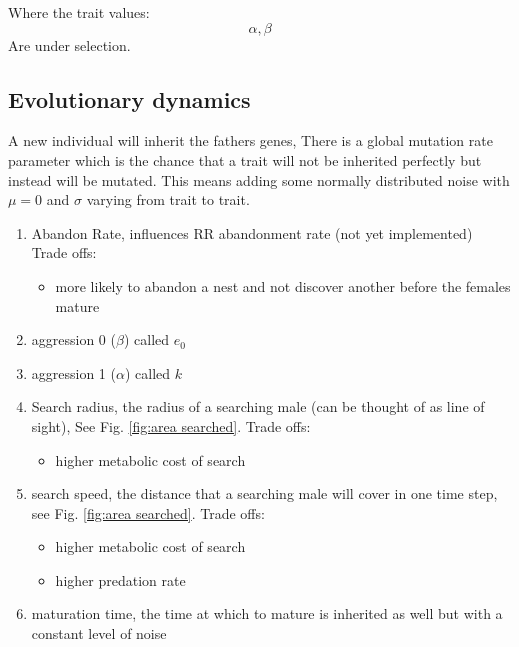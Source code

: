 \documentclass[a4paper,11pt]{article}
\begin{document}
Where the trait values:
$$\alpha , \beta$$
Are under selection.


\clearpage

\subsection{Evolutionary dynamics}

A new individual will inherit the fathers genes,
There is a global mutation rate parameter which is the chance that a trait will not be inherited perfectly but instead will be mutated.
This means adding some normally distributed noise with $\mu = 0$ and $\sigma$ varying from trait to trait.

\begin{enumerate}
    \item Abandon Rate, influences RR abandonment rate (not yet implemented)
    Trade offs:
    \begin{itemize}
        \item more likely to abandon a nest and not discover another before the females mature
    \end{itemize}

    \item aggression 0 ($\beta$) called $e_0$
    \item aggression 1 ($\alpha$) called $k$
    
    \item Search radius, the radius of a searching male (can be thought of as line of sight), See Fig. \ref{fig:area searched}.
    Trade offs:
    \begin{itemize}
        \item higher metabolic cost of search
    \end{itemize}

    \item search speed, the distance that a searching male will cover in one time step, see Fig. \ref{fig:area searched}.
    Trade offs:
        \begin{itemize}
            \item higher metabolic cost of search
            \item higher predation rate
        \end{itemize}
    \item maturation time, the time at which to mature is inherited as well but with a constant level of noise
\end{enumerate}

\clearpage
\end{document}
